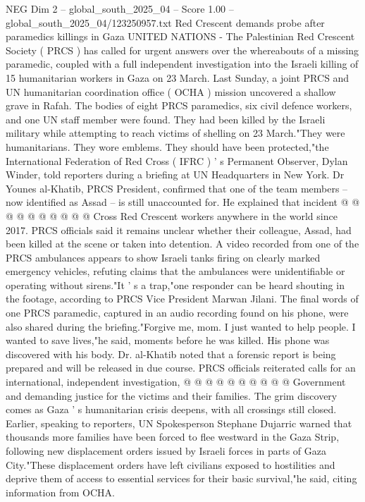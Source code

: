 \begin{textsample}{NEG Dim 2 – global\_south\_2025\_04 – Score 1.00 – global\_south\_2025\_04/123250957.txt}  \label{ex:f2_neg_099}
Red Crescent demands probe after paramedics killings in Gaza UNITED NATIONS - The Palestinian Red Crescent Society ( PRCS ) has called for urgent answers over the whereabouts of a missing paramedic, coupled with a full independent investigation into the Israeli killing of 15 humanitarian workers in Gaza on 23 March.
Last Sunday, a joint PRCS and UN humanitarian coordination office ( OCHA ) mission uncovered a shallow grave in Rafah.
The bodies of eight PRCS paramedics, six civil defence workers, and one UN staff member were found.
They had been killed by the Israeli military while attempting to reach victims of shelling on 23 March."They were humanitarians.
They wore emblems.
They should have been protected,"the International Federation of Red Cross ( IFRC ) ' s Permanent Observer, Dylan Winder, told reporters during a briefing at UN Headquarters in New York.
Dr Younes al-Khatib, PRCS President, confirmed that one of the team members -- now identified as Assad -- is still unaccounted for.
He explained that incident @ @ @ @ @ @ @ @ @ @ Cross Red Crescent workers anywhere in the world since 2017.
PRCS officials said it remains unclear whether their colleague, Assad, had been killed at the scene or taken into detention.
A video recorded from one of the PRCS ambulances appears to show Israeli tanks firing on clearly marked emergency vehicles, refuting claims that the ambulances were unidentifiable or operating without sirens."It ' s a trap,"one responder can be heard shouting in the footage, according to PRCS Vice President Marwan Jilani.
The final words of one PRCS paramedic, captured in an audio recording found on his phone, were also shared during the briefing."Forgive me, mom.
I just wanted to help people.
I wanted to save lives,"he said, moments before he was killed.
His phone was discovered with his body.
Dr. al-Khatib noted that a forensic report is being prepared and will be released in due course.
PRCS officials reiterated calls for an international, independent investigation, @ @ @ @ @ @ @ @ @ @ Government and demanding justice for the victims and their families.
The grim discovery comes as Gaza ' s humanitarian crisis deepens, with all crossings still closed.
Earlier, speaking to reporters, UN Spokesperson Stephane Dujarric warned that thousands more families have been forced to flee westward in the Gaza Strip, following new displacement orders issued by Israeli forces in parts of Gaza City."These displacement orders have left civilians exposed to hostilities and deprive them of access to essential services for their basic survival,"he said, citing information from OCHA.

\end{textsample}
